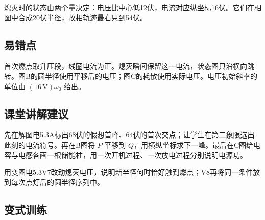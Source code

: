 \documentclass[UTF8,fontset=fandol,a4paper,11pt]{ctexart}
\begin{document}
熄灭时的状态由两个量决定：电压比中心低12伏，电流对应纵坐标16伏。它们在相图中合成20伏半径，故相轨迹最右只到54伏。



\subsection*{易错点}

首次燃点取升压段，线圈电流为正。熄灭瞬间保留这一电流，状态图只沿横向跳转。图B的圆半径使用平移后的电压；图C的耗散使用实际电压。电压初始斜率的单位由 $(16\,\mathrm V)\omega_0$ 给出。



\subsection*{课堂讲解建议}

先在解图电5.3A标出68伏的假想首峰、64伏的首次交点；让学生在第二象限选出此刻的电流符号。再在B图将 $P$ 平移到 $Q$，用横纵坐标求下一峰。最后在C图给电容与电感各画一根储能柱，用一次开机过程、一次放电过程分别说明电源功。

用变图电5.3V7改动熄灭电压，说明新半径何时恰好触到燃点；V8再将同一条件放到每次点灯后的圆半径序列中。


\subsection*{变式训练}
\end{document}
